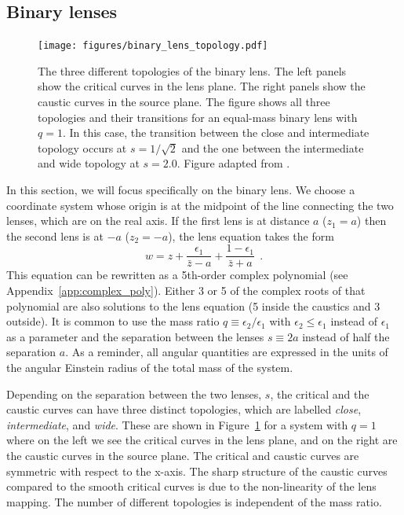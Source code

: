 \documentclass[12pt,dvipsnames]{report}
\newcommand{\hquad}{~~}
\begin{document}
\subsection{Binary lenses}
\begin{figure}[t!]
    \centering
    \texttt{[image: figures/binary\_lens\_topology.pdf]}
    \caption{The three different topologies of the binary lens. The left panels show the
        critical curves in the lens plane. The right panels show the caustic curves in the
        source plane. The figure shows all three topologies and their transitions
        for an equal-mass binary lens with $q=1$. In this case, the transition between
        the close and intermediate topology occurs at $s=1/\sqrt{2}$ and the one between
        the intermediate and wide topology at $s=2.0$. Figure adapted from
        \citet{dominik1999}.
    }
    \label{fig:binary_lens_topology}
\end{figure}
In this section, we will focus specifically on the binary lens. We choose a
coordinate system whose origin is at the midpoint of the line connecting the
two lenses, which are on the real axis. If the first lens is at
distance $a$ ($z_1=a$) then the second lens is at $-a$ ($z_2=-a$), the lens equation
takes the form
\begin{equation}
    w=z+\frac{\epsilon_{1}}{\bar{z} - a}+\frac{1 - \epsilon_{1}}{\bar{z} + a}
    \hquad.
\end{equation}
This equation can be rewritten as a 5th-order complex polynomial
(see Appendix~\ref{app:complex_poly}). Either 3 or 5 of the complex roots of that
polynomial are also solutions to the lens equation
(5 inside the caustics and 3 outside).
It is common to use the mass ratio $q\equiv \epsilon_2/\epsilon_1$ with
$\epsilon_2 \leq \epsilon_1$ instead  of $\epsilon_1$ as a parameter and the
separation between the lenses $s\equiv 2a$ instead of half the separation $a$.
As a reminder, all angular quantities are expressed in the units of the angular Einstein
radius of the total mass of the system.

Depending on the separation between the two lenses, $s$, the critical and the
caustic curves can have three distinct topologies, which are labelled
\emph{close}, \emph{intermediate}, and \emph{wide}. These are shown in
Figure~\ref{fig:binary_lens_topology} for a system with $q=1$ where on the left
we see the critical curves in the lens plane, and on the right are the caustic
curves in the source plane. The critical and caustic curves are symmetric with
respect to the x-axis. The sharp structure of the caustic curves compared to
the smooth critical curves is due to the non-linearity of the lens mapping. The
number of different topologies is independent of the mass ratio.
\end{document}
